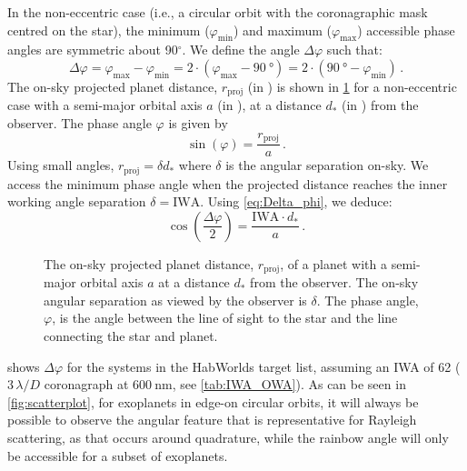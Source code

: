 \documentclass[
    usenatbib,
]{mnras}
\newcommand{\hwo}{HabWorlds}
\begin{document}
In the non-eccentric case (i.e., a circular orbit with the coronagraphic mask centred on the star), the minimum ($\varphi_\mathrm{min}$) and maximum ($\varphi_\mathrm{max}$) accessible phase angles are symmetric about 90$^\circ$. 
%
We define the angle $\Delta \varphi$ such that: 
\begin{equation}
 \label{eq:Delta_phi}
    \Delta \varphi 
    = \varphi_\mathrm{max} - \varphi_\mathrm{min}
    =  2 \cdot (\varphi_\mathrm{max} - \qty{90}{\degree}) 
    =  2 \cdot (\qty{90}{\degree} - \varphi_\mathrm{min} )  \,.
\end{equation} 
The on-sky projected planet distance, $r_\mathrm{proj}$ (in \unit{\au}) is shown in \cref{fig:scattering-angle} for a non-eccentric case with a 
semi-major orbital axis $a$ (in \unit{\au}), at a distance $d_*$ (in \unit{\parsec}) from the observer. 
%
The phase angle $\varphi$ is given by
\begin{equation}
    \sin(\varphi) = \frac{r_\mathrm{proj}}{a} \,.
\end{equation}
%
Using small angles, $r_\mathrm{proj} = \delta d_*$ where $\delta$ is the angular separation on-sky.
%
We access the minimum phase angle when the projected distance reaches the inner working angle separation $\delta = \mathrm{IWA}$. 
%
Using \cref{eq:Delta_phi}, we deduce:
%
\begin{equation}
    \label{eq:scattering_angle}
    \cos\left(\dfrac{\Delta \varphi}{2}\right) = \frac{\mathrm{IWA} 
    \cdot d_*}{a} \,.
\end{equation}

\begin{figure}
    \centering
    
    \caption{
        The on-sky projected planet distance, $r_\mathrm{proj}$, of a planet with a semi-major orbital axis $a$ at a distance $d_*$ from the observer.
        The on-sky angular separation as viewed by the observer is $\delta$.
        The phase angle, $\varphi$, is the angle between the line of sight to the star and the line connecting the star and planet.  
    }
    \label{fig:scattering-angle}
\end{figure}

 shows $\Delta \varphi$ for the systems in the \hwo{} target list, assuming an IWA of \qty{62}{\mas} ($3\,\lambda / D$ coronagraph at $\qty{600}{\nano\meter}$, see \cref{tab:IWA_OWA}). 
%
%
As can be seen in \cref{fig:scatterplot}, for exoplanets in edge-on circular orbits, it will always be possible to observe the angular feature that is representative for Rayleigh scattering, as that occurs around quadrature, while the rainbow angle will only be accessible for a subset of exoplanets.
\end{document}
